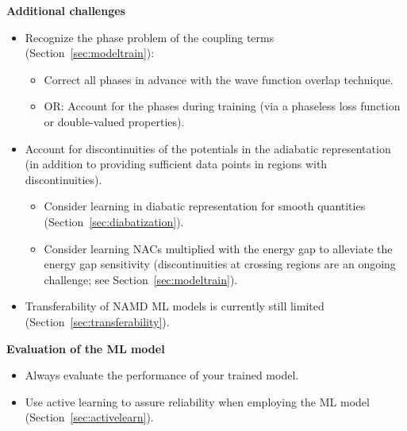 \documentclass[9pt,bestpractices]{livecoms}
\begin{document}
\begin{Checklists*}[p!]
\begin{checklist}

\textbf{Additional challenges}
\begin{itemize}
\item Recognize the phase problem of the coupling terms (Section~\ref{sec:modeltrain}):%
\begin{itemize}
\item Correct all phases in advance with the wave function overlap technique.
\item OR: Account for the phases during training (via a phaseless loss function or double-valued properties).
\end{itemize}
\item Account for discontinuities of the potentials in the adiabatic representation (in addition to providing sufficient data points in regions with discontinuities).
\begin{itemize}
\item Consider learning in diabatic representation for smooth quantities 
(Section~\ref{sec:diabatization}).
\item Consider learning NACs multiplied with the energy gap to alleviate the energy gap sensitivity (discontinuities at crossing regions are an ongoing challenge; see Section~\ref{sec:modeltrain}).
\end{itemize}
\item Transferability of NAMD ML models is currently still limited (Section~\ref{sec:transferability}).
\end{itemize}

\textbf{Evaluation of the ML model}
\begin{itemize}
\item Always evaluate the performance of your trained model.
\item Use active learning to assure reliability when employing the ML model (Section~\ref{sec:activelearn}).
\end{itemize}
\end{checklist}




\end{Checklists*}
\end{document}
